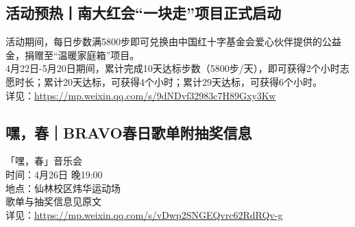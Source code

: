 \documentclass[letterpaper, 12pt]{article}
\begin{document}
\begin{multicols}{2}
\subsection{活动预热丨南大红会“一块走”项目正式启动} %
活动期间，每日步数满5800步即可兑换由中国红十字基金会爱心伙伴提供的公益金，捐赠至“温暖家庭箱”项目。
\\4月22日-5月20日期间，累计完成10天达标步数（5800步/天），即可获得2个小时志愿时长；累计20天达标，可获得4个小时；累计29天达标，可获得6个小时。
\\详见：\url{https://mp.weixin.qq.com/s/9dNDvf32983c7H89Gxy3Kw}
\subsection{嘿，春｜BRAVO春日歌单附抽奖信息} %
「嘿，春」音乐会
\\时间：4月26日 晚19:00 
\\地点：仙林校区炜华运动场
\\歌单与抽奖信息见原文
\\详见：\url{https://mp.weixin.qq.com/s/vDwp2SNGEQvrc62RdRQv-g}

\end{multicols}
\end{document}
